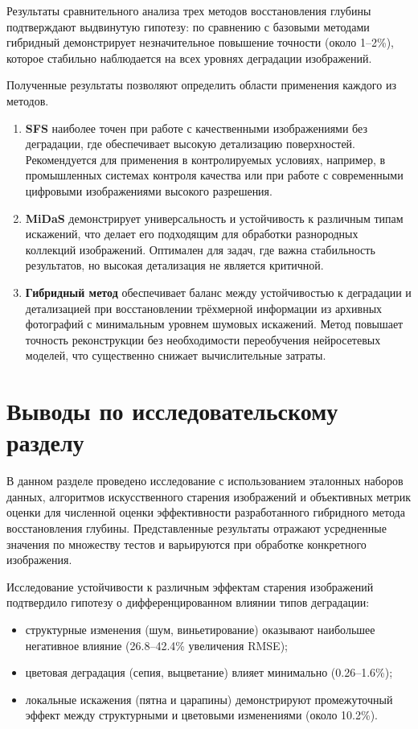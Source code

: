 Результаты сравнительного анализа трех методов восстановления глубины подтверждают выдвинутую гипотезу: по сравнению с базовыми методами
гибридный демонстрирует незначительное повышение точности (около 1--2\%), которое стабильно наблюдается на всех уровнях деградации изображений.

Полученные результаты позволяют определить области применения каждого из методов.
\begin{enumerate}
    \item \textbf{SFS} наиболее точен при работе с качественными изображениями без деградации, где обеспечивает высокую детализацию поверхностей. Рекомендуется для применения в контролируемых условиях, например, в промышленных системах контроля качества или при работе с современными цифровыми изображениями высокого разрешения.
    \item \textbf{MiDaS} демонстрирует универсальность и устойчивость к различным типам искажений, что делает его подходящим для обработки разнородных коллекций изображений. Оптимален для задач, где важна стабильность результатов, но высокая детализация не является критичной.
    \item \textbf{Гибридный метод} обеспечивает баланс между устойчивостью к деградации и детализацией при восстановлении трёхмерной информации из архивных фотографий с минимальным уровнем шумовых искажений. Метод повышает точность реконструкции без необходимости переобучения нейросетевых моделей, что существенно снижает вычислительные затраты.
\end{enumerate}

\section*{Выводы по исследовательскому разделу}

В данном разделе проведено исследование с использованием эталонных наборов данных,
алгоритмов искусственного старения изображений и объективных метрик оценки
для численной оценки эффективности разработанного гибридного метода восстановления глубины.
Представленные результаты отражают усредненные значения по множеству тестов и варьируются при обработке конкретного изображения.

Исследование устойчивости к различным эффектам старения изображений подтвердило гипотезу о дифференцированном влиянии типов деградации:

\begin{itemize}
    \item структурные изменения (шум, виньетирование) оказывают наибольшее негативное влияние (26.8--42.4\% увеличения RMSE);
    \item цветовая деградация (сепия, выцветание) влияет минимально (0.26--1.6\%);
    \item локальные искажения (пятна и царапины) демонстрируют промежуточный эффект между структурными и цветовыми изменениями (около 10.2\%).
\end{itemize}

